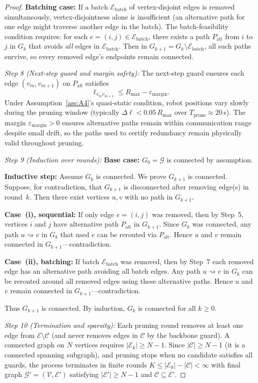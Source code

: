 \begin{proof}
\textbf{Batching case:} If a batch $\mathcal{E}_{\mathrm{batch}}$ of vertex-disjoint edges is removed simultaneously, vertex-disjointness alone is insufficient (an alternative path for one edge might traverse another edge in the batch).
The batch-feasibility condition requires: for each $e=(i,j)\in\mathcal{E}_{\mathrm{batch}}$, there exists a path $P_{\mathrm{alt}}$ from $i$ to $j$ in $G_k$ that avoids \emph{all} edges in $\mathcal{E}_{\mathrm{batch}}$.
Then in $G_{k+1}=G_k\setminus\mathcal{E}_{\mathrm{batch}}$, all such paths survive, so every removed edge's endpoints remain connected.

\emph{Step 8 (Next-step guard and margin safety):}
The next-step guard ensures each edge $(v_m,v_{m+1})$ on $P_{\mathrm{alt}}$ satisfies
\[
\ell_{v_m v_{m+1}} \le R_{\max}-\varepsilon_{\mathrm{margin}}.
\]
Under Assumption~\ref{ass:A4}'s quasi-static condition, robot positions vary slowly during the pruning window (typically $\Delta\ell<0.05\,R_{\max}$ over $T_{\mathrm{prune}}\approx 20$\,s).
The margin $\varepsilon_{\mathrm{margin}}>0$ ensures alternative paths remain within communication range despite small drift, so the paths used to certify redundancy remain physically valid throughout pruning.

\emph{Step 9 (Induction over rounds):}
\textbf{Base case:} $G_0=\mathcal{G}$ is connected by assumption.

\textbf{Inductive step:} Assume $G_k$ is connected. We prove $G_{k+1}$ is connected.
Suppose, for contradiction, that $G_{k+1}$ is disconnected after removing edge(s) in round~$k$.
Then there exist vertices $u,v$ with no path in $G_{k+1}$.

\textbf{Case~(i), sequential:} If only edge $e=(i,j)$ was removed, then by Step~5, vertices $i$ and $j$ have alternative path $P_{\mathrm{alt}}$ in $G_{k+1}$.
Since $G_k$ was connected, any path $u\rightsquigarrow v$ in $G_k$ that used $e$ can be rerouted via $P_{\mathrm{alt}}$.
Hence $u$ and $v$ remain connected in $G_{k+1}$—contradiction.

\textbf{Case~(ii), batching:} If batch $\mathcal{E}_{\mathrm{batch}}$ was removed, then by Step~7 each removed edge has an alternative path avoiding all batch edges.
Any path $u\rightsquigarrow v$ in $G_k$ can be rerouted around all removed edges using these alternative paths.
Hence $u$ and $v$ remain connected in $G_{k+1}$—contradiction.

Thus $G_{k+1}$ is connected. By induction, $G_k$ is connected for all $k\ge 0$.

\emph{Step 10 (Termination and sparsity):}
Each pruning round removes at least one edge from $\mathcal{E}\setminus\mathcal{C}$ (and never removes edges in $\mathcal{C}$ by the backbone guard).
A connected graph on $N$ vertices requires $|\mathcal{E}_k|\ge N-1$.
Since $|\mathcal{C}|\ge N-1$ (it is a connected spanning subgraph), and pruning stops when no candidate satisfies all guards, the process terminates in finite rounds $K\le|\mathcal{E}_0|-|\mathcal{C}|<\infty$ with final graph $\mathcal{G}'=(\mathcal{V},\mathcal{E}')$ satisfying $|\mathcal{E}'|\ge N-1$ and $\mathcal{C}\subseteq\mathcal{E}'$.


\end{proof}
